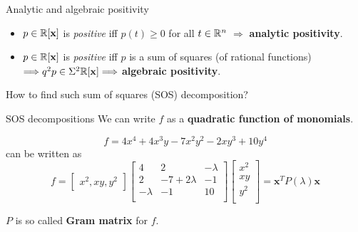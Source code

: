 \begin{frame}{Analytic and algebraic positivity}

\begin{itemize}
  \item $p\in \mathbb{R}[\mathbf{x}]$ is \textit{positive} iff $p(t) \geqslant 0$ for all $t \in\mathbb{R}^n$ $\Longrightarrow $ \textbf{analytic positivity}.
  \item $p\in \mathbb{R}[\mathbf{x}]$ is \textit{positive} iff $p$ is a sum of squares (of rational functions) $\Longrightarrow q^2p\in \Sigma^2 \mathbb{R}[\mathbf{x}] \Longrightarrow $ \textbf{algebraic positivity}.

\end{itemize}
\pause
\begin{problem}
   How to find such sum of squares (SOS) decomposition?
\end{problem}


\end{frame}



\begin{frame}{SOS decompositions}
   \pause
   We can write $f$ as a \textbf{quadratic function of monomials}.

   \begin{example}


   \[
   f = 4x^4 + 4x^3y - 7x^2y^2 - 2xy^3 + 10y^4
   \]
   can be written as
   \[ f =
   \begin{bmatrix}
      x^2, xy, y^2
   \end{bmatrix}
   \begin{bmatrix}
      4         & 2               & -\lambda\\
      2         & -7 + 2\lambda   & -1\\
      -\lambda  & -1              & 10\\
   \end{bmatrix}
   \begin{bmatrix}
    x^2 \\
    xy \\
    y^2 \\
   \end{bmatrix}
   = \mathbf{x}^T P(\lambda) \mathbf{x}
   \]
   \end{example}
   \pause
   $P$ is so called \textbf{Gram matrix} for $f$.

\end{frame}

